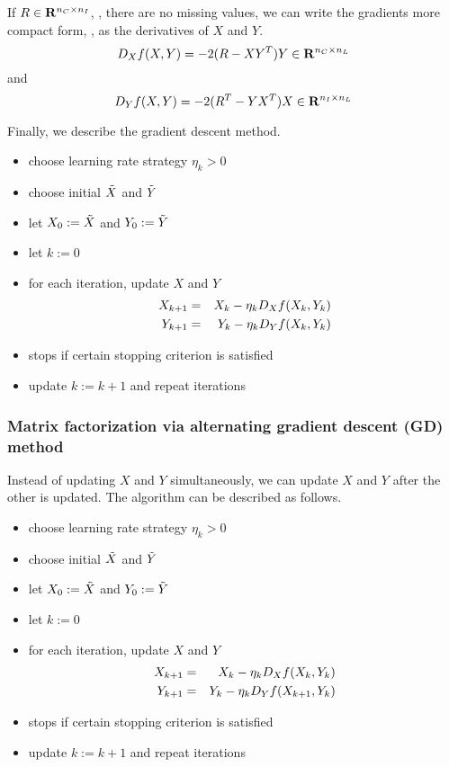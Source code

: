 If $R\in\mathbf{R}^{{n_C} \times {n_I}}$,
\ie, there are no missing values,
we can write the gradients more compact form,
\ie, as the derivatives of $X$ and $Y$.
\begin{equation}
\label{eq:mat-fac-sq-deriv-x}
D_X f(X,Y) = -2 (R-XY^T) Y
\in\mathbf{R}^{{n_C}\times{n_L}}
\end{equation}
and
\begin{equation}
\label{eq:mat-fac-sq-deriv-y}
D_Y f(X,Y) = -2 (R^T-YX^T) X
\in\mathbf{R}^{{n_I}\times{n_L}}
\end{equation}


Finally, we describe the gradient descent method.

\begin{itemize}
\item choose learning rate strategy $\eta_k>0$
\item choose initial $\tilde{X}$ and $\tilde{Y}$
\item let ${{X}_{0}}:=\tilde{X}$ and ${{Y}_{0}}:=\tilde{Y}$
\item let $k:=0$
\item for each iteration, update $X$ and $Y$
\begin{eqnarray}
    {{X}_{k+1}} &=& {{X}_{k}} - \eta_k D_X f({{X}_{k}},{{Y}_{k}})
\\
\label{eq:btai}
    {{Y}_{k+1}} &=& {{Y}_{k}} - \eta_k D_Y f({{X}_{k}},{{Y}_{k}})
\end{eqnarray}
\item stops if certain stopping criterion is satisfied
\item update $k:=k+1$ and repeat iterations
\end{itemize}

\subsubsection{Matrix factorization via alternating gradient descent (GD) method}

Instead of updating $X$ and $Y$ simultaneously,
we can update $X$ and $Y$ after the other is updated.
The algorithm can be described as follows.

\begin{itemize}
\item choose learning rate strategy $\eta_k>0$
\item choose initial $\tilde{X}$ and $\tilde{Y}$
\item let ${{X}_{0}}:=\tilde{X}$ and ${{Y}_{0}}:=\tilde{Y}$
\item let $k:=0$
\item for each iteration, update $X$ and $Y$
\begin{eqnarray}
    {{X}_{k+1}} &=& {{X}_{k}} - \eta_k D_X f({{X}_{k}},{{Y}_{k}})
\\
\label{eq:bhio}
    {{Y}_{k+1}} &=& {{Y}_{k}} - \eta_k D_Y f({{X}_{k+1}},{{Y}_{k}})
\end{eqnarray}
\item stops if certain stopping criterion is satisfied
\item update $k:=k+1$ and repeat iterations
\end{itemize}

